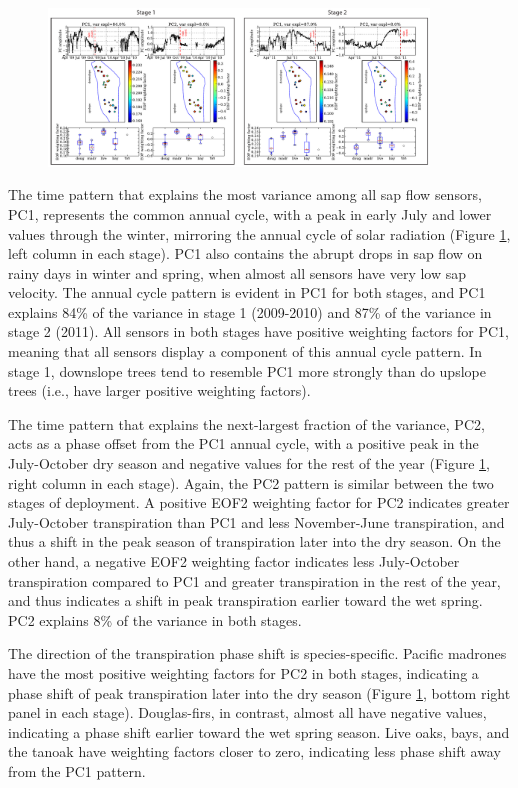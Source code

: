 \begin{figure}[here]
\includegraphics[width=0.9\textwidth]{ch1-sapflow/figures/Figure05.pdf}
\caption{}
\label{fig:sapflow_eof}
\end{figure}

The time pattern that explains the most variance among all sap flow sensors, PC1, represents the common annual cycle, with a peak in early July and lower values through the winter, mirroring the annual cycle of solar radiation (Figure \ref{fig:sapflow_eof}, left column in each stage).  PC1 also contains the abrupt drops in sap flow on rainy days in winter and spring, when almost all sensors have very low sap velocity.  The annual cycle pattern is evident in PC1 for both stages, and PC1 explains 84\% of the variance in stage 1 (2009-2010) and 87\% of the variance in stage 2 (2011).  All sensors in both stages have positive weighting factors for PC1, meaning that all sensors display a component of this annual cycle pattern.  In stage 1, downslope trees tend to resemble PC1 more strongly than do upslope trees (i.e., have larger positive weighting factors).

The time pattern that explains the next-largest fraction of the variance, PC2, acts as a phase offset from the PC1 annual cycle, with a positive peak in the July-October dry season and negative values for the rest of the year (Figure \ref{fig:sapflow_eof}, right column in each stage).  Again, the PC2 pattern is similar between the two stages of deployment.  A positive EOF2 weighting factor for PC2 indicates greater July-October transpiration than PC1 and less November-June transpiration, and thus a shift in the peak season of transpiration later into the dry season.  On the other hand, a negative EOF2 weighting factor indicates less July-October transpiration compared to PC1 and greater transpiration in the rest of the year, and thus indicates a shift in peak transpiration earlier toward the wet spring.  PC2 explains 8\% of the variance in both stages.

The direction of the transpiration phase shift is species-specific.  Pacific madrones have the most positive weighting factors for PC2 in both stages, indicating a phase shift of peak transpiration later into the dry season (Figure \ref{fig:sapflow_eof}, bottom right panel in each stage).  Douglas-firs, in contrast, almost all have negative values, indicating a phase shift earlier toward the wet spring season.  Live oaks, bays, and the tanoak have weighting factors closer to zero, indicating less phase shift away from the PC1 pattern.

